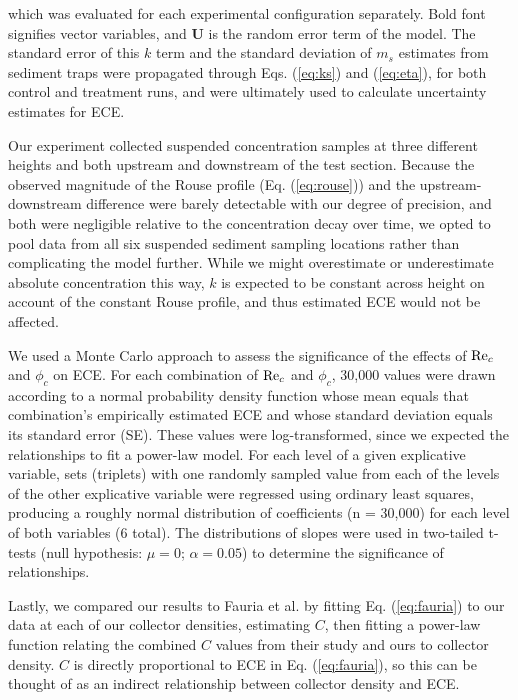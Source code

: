 \documentclass[geosciences,article,submit,moreauthors,pdftex]{Definitions/mdpi}
\begin{document}
\noindent which was evaluated for each experimental configuration separately. Bold font signifies vector variables, and $\boldsymbol{U}$ is the random error term of the model. The standard error of this $k$ term and the standard deviation of $m_s$ estimates from sediment traps were propagated through Eqs. (\ref{eq:ks}) and (\ref{eq:eta}), for both control and treatment runs, and were ultimately used to calculate uncertainty estimates for ECE.

Our experiment collected suspended concentration samples at three different heights and both upstream and downstream of the test section. Because the observed magnitude of the Rouse profile (Eq. (\ref{eq:rouse})) and the upstream-downstream difference were barely detectable with our degree of precision, and both were negligible relative to the concentration decay over time, we opted to pool data from all six suspended sediment sampling locations rather than complicating the model further. While we might overestimate or underestimate absolute concentration this way, $k$ is expected to be constant across height on account of the constant Rouse profile, and thus estimated ECE would not be affected.

We used a Monte Carlo approach to assess the significance of the effects of $\mathrm{Re}_c$ and $\phi_c$ on ECE. For each combination of $\mathrm{Re}_c$ and $\phi_c$, 30,000 values were drawn according to a normal probability density function whose mean equals that combination's empirically estimated ECE and whose standard deviation equals its standard error (SE). These values were log-transformed, since we expected the relationships to fit a power-law model. For each level of a given explicative variable, sets (triplets) with one randomly sampled value from each of the levels of the other explicative variable were regressed using ordinary least squares, producing a roughly normal distribution of coefficients (n = 30,000) for each level of both variables (6 total). The distributions of slopes were used in two-tailed t-tests (null hypothesis: $\mu = 0$; $\alpha = 0.05$) to determine the significance of relationships.

Lastly, we compared our results to Fauria et al. \cite{Fauria_2015} by fitting Eq. (\ref{eq:fauria}) to our data at each of our collector densities, estimating $C$, then fitting a power-law function relating the combined $C$ values from their study and ours to collector density. $C$ is directly proportional to ECE in Eq. (\ref{eq:fauria}), so this can be thought of as an indirect relationship between collector density and ECE.
\end{document}
